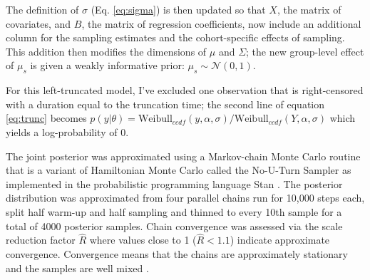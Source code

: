 \documentclass{article}
\begin{document}
The definition of \(\sigma\) (Eq. \ref{eq:sigma}) is then updated so that \(X\), the matrix of covariates, and \(B\), the matrix of regression coefficients, now include an additional column for the sampling estimates and the cohort-specific effects of sampling. This addition then modifies the dimensions of \(\mu\) and \(\Sigma\); the new group-level effect of \(\mu_{s}\) is given a weakly informative prior: \(\mu_{s} \sim \mathcal{N}(0, 1)\).

For this left-truncated model, I've excluded one observation that is right-censored with a duration equal to the truncation time; the second line of equation \ref{eq:trunc} becomes \(p(y | \theta) = \mathrm{Weibull}_{ccdf}(y, \alpha, \sigma) / \mathrm{Weibull}_{ccdf}(Y, \alpha, \sigma)\) which yields a log-probability of 0.


The joint posterior was approximated using a Markov-chain Monte Carlo routine that is a variant of Hamiltonian Monte Carlo called the No-U-Turn Sampler \citep{Hoffman2014} as implemented in the probabilistic programming language Stan \citep{2014stan}. The posterior distribution was approximated from four parallel chains run for 10,000 steps each, split half warm-up and half sampling and thinned to every 10th sample for a total of 4000 posterior samples. Chain convergence was assessed via the scale reduction factor \(\hat{R}\) where values close to 1 (\(\hat{R} < 1.1\)) indicate approximate convergence. Convergence means that the chains are approximately stationary and the samples are well mixed \citep{Gelman2013d}.
\end{document}
